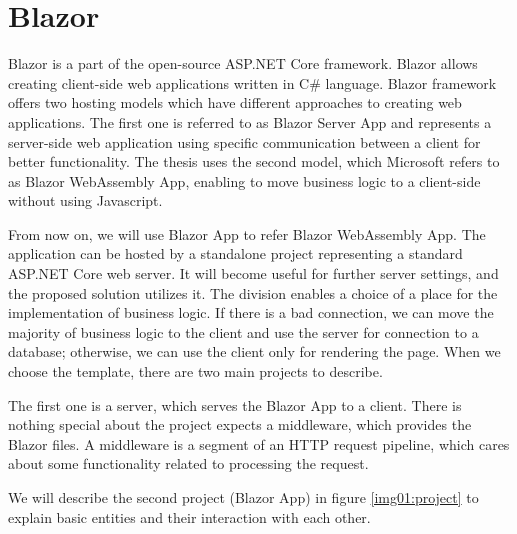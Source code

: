 \section{Blazor}
Blazor is a part of the open-source ASP.NET Core framework.
Blazor allows creating client-side web applications written in C\# language.
Blazor framework offers two hosting models  which have different approaches to creating web applications. 
The first one is referred to as Blazor Server App and represents a server-side web application using specific communication between a client for better functionality.
The thesis uses the second model, which Microsoft refers to as Blazor WebAssembly App, enabling to move business logic to a client-side without using Javascript.
\par
From now on, we will use Blazor App to refer Blazor WebAssembly App.
The application can be hosted by a standalone project representing a standard ASP.NET Core web server.
It will become useful for further server settings, and the proposed solution utilizes it.
The division enables a choice of a place for the implementation of business logic.
If there is a bad connection, we can move the majority of business logic to the client and use the server for connection to a database; otherwise, we can use the client only for rendering the page.
When we choose the template, there are two main projects to describe.
\par
The first one is a server, which serves the Blazor App to a client.
There is nothing special about the project expects a middleware, which provides the Blazor files.
A middleware is a segment of an HTTP request pipeline, which cares about some functionality related to processing the request.
\par
We will describe the second project (Blazor App) in figure \ref{img01:project} to explain basic entities and their interaction with each other.
\par
{}

